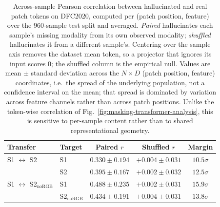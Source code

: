 \begin{table}[t]
\centering
\small
\caption{Across-sample Pearson correlation between hallucinated and real patch tokens on DFC2020, computed per (patch position, feature) over the 960-sample test split and averaged. \emph{Paired} hallucinates each sample's missing modality from its own observed modality; \emph{shuffled} hallucinates it from a different sample's. Centering over the sample axis removes the dataset mean token, so a projector that ignores its input scores $0$; the shuffled column is the empirical null. Values are mean $\pm$ standard deviation across the $N\times D$ (patch position, feature) coordinates, i.e.\ the spread of the underlying population, not a confidence interval on the mean; that spread is dominated by variation across feature channels rather than across patch positions. Unlike the token-wise correlation of Fig.~\ref{fig:masking-transformer-analysis}, this is sensitive to per-sample content rather than to shared representational geometry.}
\label{tab:hallucination_batch_corr}
\begin{tabular}{llccc}
\toprule
Transfer & Target & Paired $r$ & Shuffled $r$ & Margin \\
\midrule
S1 $\leftrightarrow$ S2 & S1 & $0.330 \pm 0.194$ & $+0.004 \pm 0.031$ & $10.5\sigma$ \\
 & S2 & $0.395 \pm 0.167$ & $+0.002 \pm 0.032$ & $12.5\sigma$ \\
\midrule
S1 $\leftrightarrow$ S2$_{\text{noRGB}}$ & S1 & $0.488 \pm 0.235$ & $+0.002 \pm 0.031$ & $15.9\sigma$ \\
 & S2$_{\text{noRGB}}$ & $0.434 \pm 0.191$ & $+0.004 \pm 0.031$ & $13.8\sigma$ \\
\bottomrule
\end{tabular}
\end{table}
